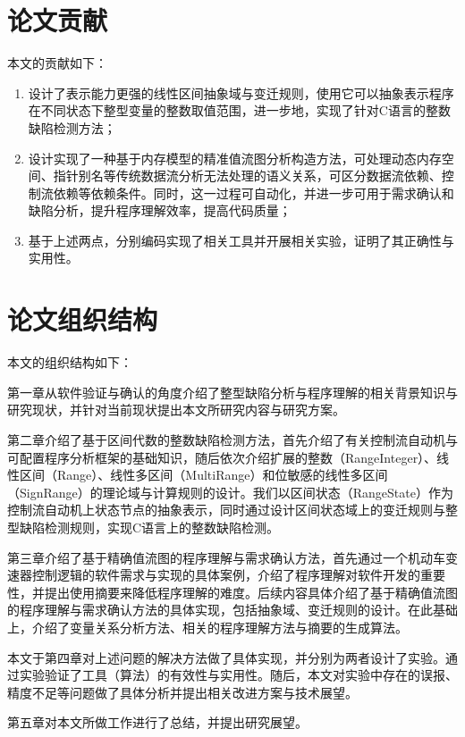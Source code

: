  
 \section{论文贡献}
 
 本文的贡献如下：
 \begin{enumerate}
 	\item 设计了表示能力更强的线性区间抽象域与变迁规则，使用它可以抽象表示程序在不同状态下整型变量的整数取值范围，进一步地，实现了针对C语言的整数缺陷检测方法；
 	
	\item 设计实现了一种基于内存模型的精准值流图分析构造方法，可处理动态内存空间、指针别名等传统数据流分析无法处理的语义关系，可区分数据流依赖、控制流依赖等依赖条件。同时，这一过程可自动化，并进一步可用于需求确认和缺陷分析，提升程序理解效率，提高代码质量；
	
	\item 基于上述两点，分别编码实现了相关工具并开展相关实验，证明了其正确性与实用性。
 \end{enumerate}
 
 \section{论文组织结构}
 
 本文的组织结构如下：
 
 第一章从软件验证与确认的角度介绍了整型缺陷分析与程序理解的相关背景知识与研究现状，并针对当前现状提出本文所研究内容与研究方案。
 
 第二章介绍了基于区间代数的整数缺陷检测方法，首先介绍了有关控制流自动机与可配置程序分析框架的基础知识，随后依次介绍扩展的整数（RangeInteger）、线性区间（Range）、线性多区间（MultiRange）和位敏感的线性多区间（SignRange）的理论域与计算规则的设计。我们以区间状态（RangeState）作为控制流自动机上状态节点的抽象表示，同时通过设计区间状态域上的变迁规则与整型缺陷检测规则，实现C语言上的整数缺陷检测。
 
 第三章介绍了基于精确值流图的程序理解与需求确认方法，首先通过一个机动车变速器控制逻辑的软件需求与实现的具体案例，介绍了程序理解对软件开发的重要性，并提出使用摘要来降低程序理解的难度。后续内容具体介绍了基于精确值流图的程序理解与需求确认方法的具体实现，包括抽象域、变迁规则的设计。在此基础上，介绍了变量关系分析方法、相关的程序理解方法与摘要的生成算法。
 
本文于第四章对上述问题的解决方法做了具体实现，并分别为两者设计了实验。通过实验验证了工具（算法）的有效性与实用性。随后，本文对实验中存在的误报、精度不足等问题做了具体分析并提出相关改进方案与技术展望。

第五章对本文所做工作进行了总结，并提出研究展望。
 
 
 
 
 
 
 
 
 
 
 
 
 
 
 
 
 
 
 
 
 
 
 
 
 
 
 
 
 
 
 
 
 
